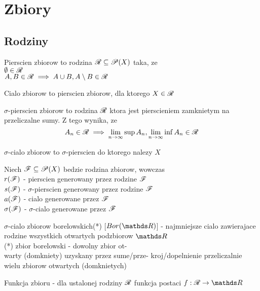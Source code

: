 \section{Zbiory}
\subsection{Rodziny}
\begin{multicols*}{2}
    
    {\color{def}Pierscien zbiorow} to rodzina $\mathcal{R}\subseteq \mathcal{P}(X)$ taka, ze\smallskip\\
    \point $\emptyset\in \mathcal{R}$\smallskip\\
    \point $A, B\in\mathcal{R}\implies A\cup B,A\setminus B\in \mathcal{R}$\smallskip
    
    {\color{def}Cialo zbiorow} to pierscien zbiorow, dla ktorego $X\in\mathcal{R}$\smallskip

    {\color{def}$\sigma$-pierscien zbiorow} to rodzina $\mathcal{R}$ ktora jest pierscieniem zamknietym na przeliczalne sumy. Z tego wynika, ze
    $$A_n\in\mathcal{R}\implies \lim\limits_{n\to\infty}\sup A_n,\lim\limits_{n\to\infty}\inf A_n\in\mathcal{R}$$
    
    {\color{def}$\sigma$-cialo zbiorow} to $\sigma$-pierscien do ktorego nalezy $X$\medskip

    Niech $\mathcal{F}\subseteq \mathcal{P}(X)$ bedzie rodzina zbiorow, wowczas\smallskip\\
    {\color{acc}\point $r(\mathcal{F})$} - pierscien generowany przez rodzine $\mathcal{F}$\smallskip\\
    {\color{acc}\point $s(\mathcal{F})$} - $\sigma$-pierscien generowany przez rodzine $\mathcal{F}$\smallskip\\
    {\color{acc}\point $a(\mathcal{F})$} - cialo generowane przez $\mathcal{F}$\smallskip\\
    {\color{acc}\point $\sigma(\mathcal{F})$} - $\sigma$-cialo generowane przez $\mathcal{F}$\medskip

    {\color{def}$\sigma$-cialo zbiorow borelowskich(*)} [$Bor(\R)$] - najmniejsze cialo zawierajace rodzine wszystkich otwartych podzbiorow $\R$\smallskip\\
    \indent (*) {\color{acc}zbior borelowski} - dowolny zbior ot-\\
    \indent warty (domkniety) uzyskany przez sume/prze-
    \indent kroj/dopelnienie przeliczalnie wielu 
    \indent zbiorow otwartych (domknietych)\medskip

    \medskip

    {\color{def}Funkcja zbioru} - dla ustalonej rodziny $\mathcal{R}$ funkcja postaci $f:\rodz R\to\R$\smallskip


\end{multicols*}
